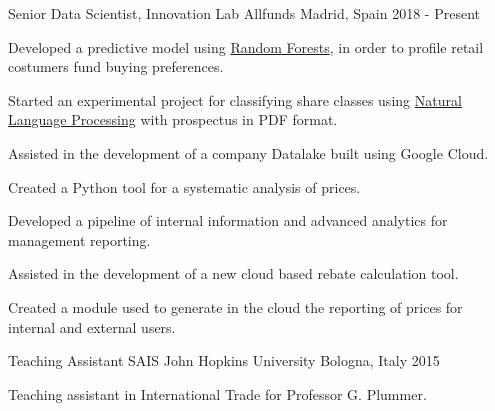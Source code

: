 

\begin{cventries}

\cventry
    {Senior Data Scientist, Innovation Lab} %
    {Allfunds} %
    {Madrid, Spain} %
    {2018 - Present} %
    {
        \begin{cvitems} %
            \item {Developed a predictive model using \href{https://en.wikipedia.org/wiki/Random_forest}{Random Forests}, in order to profile retail costumers fund buying preferences.}
            \item {Started an experimental project for classifying share classes using \href{https://en.wikipedia.org/wiki/Natural_language_processing}{Natural Language Processing} with prospectus in PDF format.}
            \item {Assisted in the development of a company Datalake built using Google Cloud.}
            \item {Created a Python tool for a systematic analysis of prices.}
            \item {Developed a pipeline of internal information and advanced analytics for management reporting.}
            \item {Assisted in the development of a new cloud based rebate calculation tool.}
            \item {Created a module used to generate in the cloud the reporting of prices for internal and external users.}
        \end{cvitems}
    }

\cventry
    {Teaching Assistant} %
    {SAIS John Hopkins University} %
    {Bologna, Italy} %
    {2015} %
    {
        \begin{cvitems} %
            \item {Teaching assistant in International Trade for Professor G. Plummer.}
        \end{cvitems}
    }


\end{cventries}
